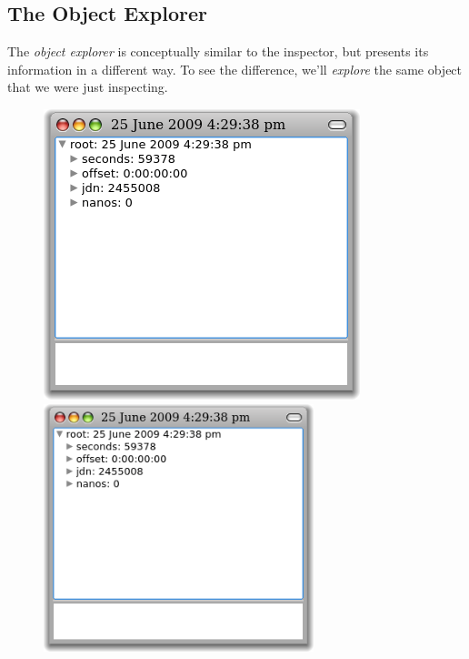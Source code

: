 \documentclass[a4paper,10pt,twoside]{book}
\begin{document}
\subsection{The Object Explorer}

The \emph{object explorer} is conceptually similar to the inspector, but presents its information in a different way.
To see the difference, we'll \emph{explore} the same object that we were just inspecting.

\begin{figure}[tbp]
\begin{minipage}{0.48\textwidth}
	\begin{center}
	\ifluluelse
		{\includegraphics[width=\textwidth]{exploreTimeStampNow}}
		{\includegraphics[width=0.7\textwidth]{exploreTimeStampNow}}

\end{center}
\end{minipage}
\end{figure}
\end{document}
